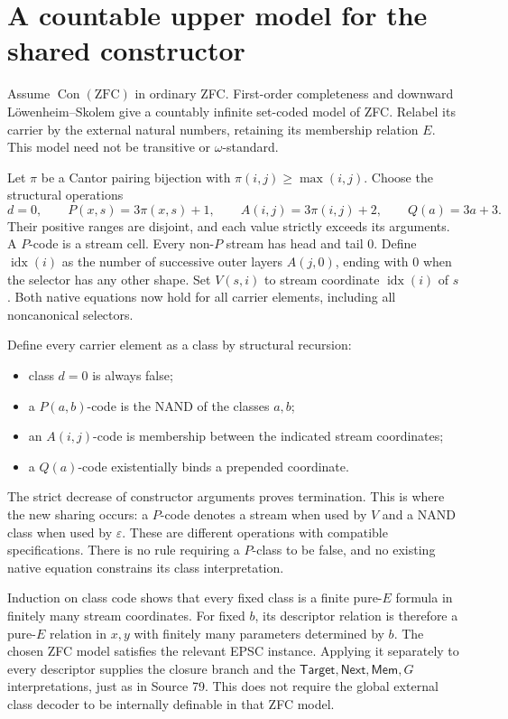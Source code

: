 \documentclass[11pt]{article}
\newcommand{\eps}{\varepsilon}
\newcommand{\Con}{\operatorname{Con}}
\begin{document}
\section{A countable upper model for the shared constructor}

Assume $\Con(\mathrm{ZFC})$ in ordinary ZFC. First-order completeness
and downward L\"owenheim--Skolem give a countably infinite set-coded model
of ZFC. Relabel its carrier by the external natural numbers, retaining its
membership relation $E$. This model need not be transitive or
$\omega$-standard.

Let $\pi$ be a Cantor pairing bijection with
$\pi(i,j)\geq\max(i,j)$. Choose the structural operations
\[
 d=0,\qquad P(x,s)=3\pi(x,s)+1,\qquad
 A(i,j)=3\pi(i,j)+2,\qquad Q(a)=3a+3.
\]
Their positive ranges are disjoint, and each value strictly exceeds its
arguments. A $P$-code is a stream cell. Every non-$P$ stream has head and
tail 0. Define $\operatorname{idx}(i)$ as the number of successive outer
layers $A(j,0)$, ending with 0 when the selector has any other shape.
Set $V(s,i)$ to stream coordinate $\operatorname{idx}(i)$ of $s$.
Both native equations now hold for all carrier elements, including all
noncanonical selectors.

Define every carrier element as a class by structural recursion:
\begin{itemize}
 \item class $d=0$ is always false;
 \item a $P(a,b)$-code is the NAND of the classes $a,b$;
 \item an $A(i,j)$-code is membership between the indicated stream coordinates;
 \item a $Q(a)$-code existentially binds a prepended coordinate.
\end{itemize}
The strict decrease of constructor arguments proves termination. This is
where the new sharing occurs: a $P$-code denotes a stream when used by $V$
and a NAND class when used by $\eps$. These are different operations with
compatible specifications. There is no rule requiring a $P$-class to be
false, and no existing native equation constrains its class interpretation.

Induction on class code shows that every fixed class is a finite pure-$E$
formula in finitely many stream coordinates. For fixed $b$, its descriptor
relation is therefore a pure-$E$ relation in $x,y$ with finitely many
parameters determined by $b$. The chosen ZFC model satisfies the relevant
EPSC instance. Applying it separately to every descriptor supplies the
closure branch and the $\mathsf{Target},\mathsf{Next},\mathsf{Mem},G$
interpretations, just as in Source 79. This does not require the global
external class decoder to be internally definable in that ZFC model.
\end{document}
